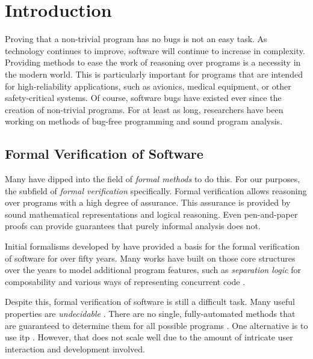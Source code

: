 \chapter{Introduction}
Proving that a non-trivial program has no bugs is not an easy task.
As technology continues to improve, software will continue to increase in complexity.
Providing methods to ease the work of reasoning over programs is a necessity in the modern world.
This is particularly important for programs that are intended for high-reliability applications,
such as avionics, medical equipment, or other safety-critical systems.
Of course, software bugs have existed ever since the creation of non-trivial programs.
For at least as long, researchers have been working on methods of bug-free programming and sound program analysis.

\section{Formal Verification of Software}
Many have dipped into the field of \emph{formal methods} \autocite{butler:fm} to do this.
For our purposes, the subfield of \emph{formal verification} specifically.
Formal verification allows reasoning over programs with a high degree of assurance.
This assurance is provided by sound mathematical representations and logical reasoning.
Even pen-and-paper proofs can provide guarantees that purely informal analysis does not.

Initial formalisms developed by \textcite{floyd1967assigning,hoare1969axiomatic} have provided a basis for the formal verification of software for over fifty years.
Many works have built on those core structures over the years to model additional program features, such as \emph{separation logic} \autocite{reynolds2002separation} for composability and various ways of representing concurrent code \autocite{owicki1976gries,xu1997rely-guarantee}.

Despite this, formal verification of software is still a difficult task.
Many useful properties are \emph{undecidable} \autocite{rice1953classes,horspool1980approach,ouimet2008formal}.
There are no single, fully-automated methods that are guaranteed to determine them for all possible programs \autocite{bonacina2010theoremproving}.
One alternative is to use \ac{itp} \autocite{harrison2014itp,maric2015itp,schopf2018itp}.
However, that does not scale well due to the amount of intricate user interaction and development involved.

